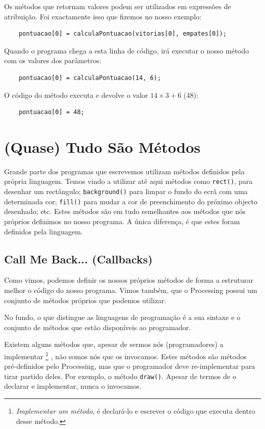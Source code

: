 Os métodos que retornam valores podem ser utilizados em expressões de atribuição. Foi exactamente isso que fizemos no nosso exemplo:
\begin{lstlisting}
    pontuacao[0] = calculaPontuacao(vitorias[0], empates[0]);
\end{lstlisting}
Quando o programa chega a esta linha de código, irá executar o nosso método com os valores dos parâmetros:
\begin{lstlisting}
    pontuacao[0] = calculaPontuacao(14, 6);
\end{lstlisting}
O código do método executa e devolve o valor $14 \times 3+6$ (48):
\begin{lstlisting}
    pontuacao[0] = 48;
\end{lstlisting}

\section{(Quase) Tudo São Métodos}
Grande parte dos programas que escrevemos utilizam métodos definidos pela própria linguagem. Temos vindo a utilizar até aqui métodos como \texttt{rect()}, para desenhar um rectângulo; \texttt{background()} para limpar o fundo do ecrã com uma determinada cor; \texttt{fill()} para mudar a cor de preenchimento do próximo objecto desenhado; etc.
Estes métodos são em tudo semelhantes aos métodos que nós próprios definimos no nosso programa. A única diferença, é que estes foram definidos pela linguagem.

\subsection{Call Me Back... (Callbacks)}
Como vimos, podemos definir os nossos próprios métodos de forma a estruturar melhor o código do nosso programa.
Vimos também, que o Processing possui um conjunto de métodos próprios que podemos utilizar.

No fundo, o que distingue as linguagens de programação é a sua sintaxe e o conjunto de métodos que estão disponíveis ao programador.

Existem alguns métodos que, apesar de sermos nós (programadores) a implementar%
\footnote{\emph{Implementar um método}, é declará-lo e escrever o código que executa dentro desse método.}%
, não somos nós que os invocamos. Estes métodos são métodos pré-definidos pelo Processing, mas que o programador deve re-implementar para tirar partido deles. Por exemplo, o método \texttt{draw()}. Apesar de termos de o declarar e implementar, nunca o invocamos. 

